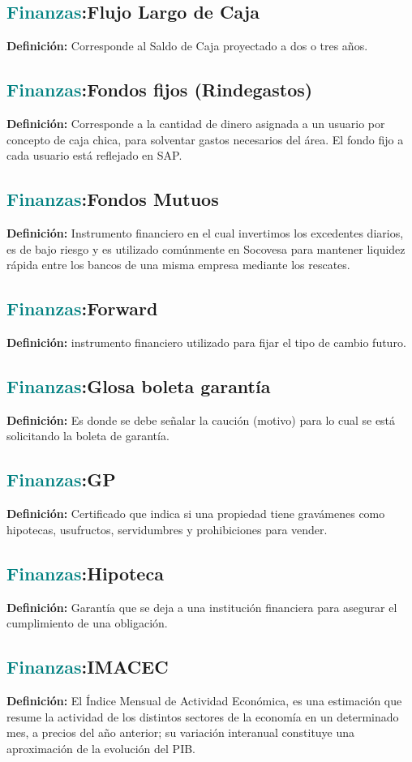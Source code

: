 \documentclass[12pt]{article}
\begin{document}
\subsection{\textcolor{teal}{Finanzas}:{Flujo Largo de Caja}}
\textbf{Definición:} Corresponde al Saldo de Caja proyectado a dos o tres años.
\subsection{\textcolor{teal}{Finanzas}:{Fondos fijos (Rindegastos)}}
\textbf{Definición:} Corresponde a la cantidad de dinero asignada a un usuario por concepto de caja chica, para solventar gastos necesarios del área. El fondo fijo a cada usuario está reflejado en SAP.
\subsection{\textcolor{teal}{Finanzas}:{Fondos Mutuos}}
\textbf{Definición:} Instrumento financiero en el cual invertimos los excedentes diarios, es de bajo riesgo y es utilizado comúnmente en Socovesa para mantener liquidez rápida entre los bancos de una misma empresa mediante los rescates.
\subsection{\textcolor{teal}{Finanzas}:{Forward}}
\textbf{Definición:} instrumento financiero utilizado para fijar el tipo de cambio futuro.
\subsection{\textcolor{teal}{Finanzas}:{Glosa boleta garantía}}
\textbf{Definición:} Es donde se debe señalar la caución (motivo) para lo cual se está solicitando la boleta de garantía.
\subsection{\textcolor{teal}{Finanzas}:{GP}}
\textbf{Definición:} Certificado que indica si una propiedad tiene gravámenes como hipotecas, usufructos, servidumbres y prohibiciones para vender.
\subsection{\textcolor{teal}{Finanzas}:{Hipoteca}}
\textbf{Definición:} Garantía que se deja a una institución financiera para asegurar el cumplimiento de una obligación.
\subsection{\textcolor{teal}{Finanzas}:{IMACEC}}
\textbf{Definición:} El Índice Mensual de Actividad Económica, es una estimación que resume la actividad de los distintos sectores de la economía en un determinado mes, a precios del año anterior; su variación interanual constituye una aproximación de la evolución del PIB.
\end{document}
